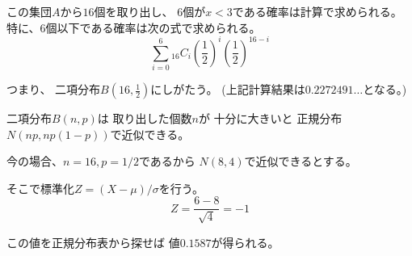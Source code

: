 \documentclass[12pt,b5paper]{ltjsarticle}
\begin{document}


この集団$A$から$16$個を取り出し、
$6$個が$x<3$である確率は計算で求められる。
特に、6個以下である確率は次の式で求められる。
\begin{equation}
 \sum_{i=0}^{6} {}_{16}C_{i} \left(\frac{1}{2}\right)^{i} \left(\frac{1}{2}\right)^{16-i}
\end{equation}

つまり、
二項分布$B\left( 16,\frac{1}{2} \right)$にしがたう。
(上記計算結果は$0.2272491\dots$となる。)

二項分布$B(n,p)$は
取り出した個数$n$が
十分に大きいと
正規分布$N(np,np(1-p))$で近似できる。

今の場合、$n=16,p=1/2$であるから
$N(8,4)$で近似できるとする。


そこで標準化$Z=(X-\mu)/\sigma$を行う。
\begin{equation}
 Z=\frac{6-8}{\sqrt{4}} = -1
\end{equation}

この値を正規分布表から探せば
値$0.1587$が得られる。









\hrulefill
\end{document}
